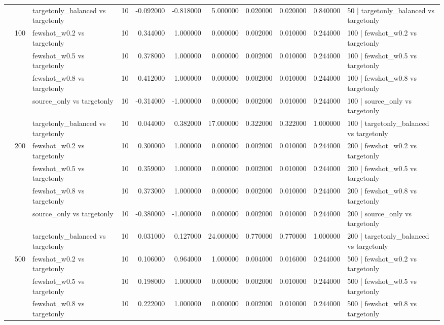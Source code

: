 \begin{tabular}{lllrrrrrrrl}
 &  & targetonly_balanced vs targetonly & 10 & -0.092000 & -0.818000 & 5.000000 & 0.020000 & 0.020000 & 0.840000 & 50 | targetonly_balanced vs targetonly \\
\cline{2-11}
 & \multirow[t]{5}{*}{100} & fewshot_w0.2 vs targetonly & 10 & 0.344000 & 1.000000 & 0.000000 & 0.002000 & 0.010000 & 0.244000 & 100 | fewshot_w0.2 vs targetonly \\
 &  & fewshot_w0.5 vs targetonly & 10 & 0.378000 & 1.000000 & 0.000000 & 0.002000 & 0.010000 & 0.244000 & 100 | fewshot_w0.5 vs targetonly \\
 &  & fewshot_w0.8 vs targetonly & 10 & 0.412000 & 1.000000 & 0.000000 & 0.002000 & 0.010000 & 0.244000 & 100 | fewshot_w0.8 vs targetonly \\
 &  & source_only vs targetonly & 10 & -0.314000 & -1.000000 & 0.000000 & 0.002000 & 0.010000 & 0.244000 & 100 | source_only vs targetonly \\
 &  & targetonly_balanced vs targetonly & 10 & 0.044000 & 0.382000 & 17.000000 & 0.322000 & 0.322000 & 1.000000 & 100 | targetonly_balanced vs targetonly \\
\cline{2-11}
 & \multirow[t]{5}{*}{200} & fewshot_w0.2 vs targetonly & 10 & 0.300000 & 1.000000 & 0.000000 & 0.002000 & 0.010000 & 0.244000 & 200 | fewshot_w0.2 vs targetonly \\
 &  & fewshot_w0.5 vs targetonly & 10 & 0.359000 & 1.000000 & 0.000000 & 0.002000 & 0.010000 & 0.244000 & 200 | fewshot_w0.5 vs targetonly \\
 &  & fewshot_w0.8 vs targetonly & 10 & 0.373000 & 1.000000 & 0.000000 & 0.002000 & 0.010000 & 0.244000 & 200 | fewshot_w0.8 vs targetonly \\
 &  & source_only vs targetonly & 10 & -0.380000 & -1.000000 & 0.000000 & 0.002000 & 0.010000 & 0.244000 & 200 | source_only vs targetonly \\
 &  & targetonly_balanced vs targetonly & 10 & 0.031000 & 0.127000 & 24.000000 & 0.770000 & 0.770000 & 1.000000 & 200 | targetonly_balanced vs targetonly \\
\cline{2-11}
 & \multirow[t]{5}{*}{500} & fewshot_w0.2 vs targetonly & 10 & 0.106000 & 0.964000 & 1.000000 & 0.004000 & 0.016000 & 0.244000 & 500 | fewshot_w0.2 vs targetonly \\
 &  & fewshot_w0.5 vs targetonly & 10 & 0.198000 & 1.000000 & 0.000000 & 0.002000 & 0.010000 & 0.244000 & 500 | fewshot_w0.5 vs targetonly \\
 &  & fewshot_w0.8 vs targetonly & 10 & 0.222000 & 1.000000 & 0.000000 & 0.002000 & 0.010000 & 0.244000 & 500 | fewshot_w0.8 vs targetonly \\

\end{tabular}
